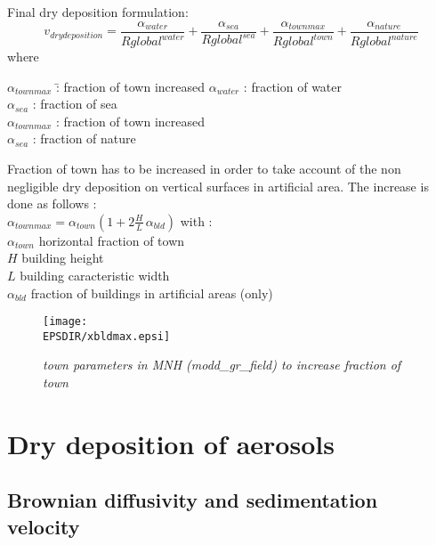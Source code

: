 Final dry deposition formulation:
$$
v_{dry deposition} = \frac{\alpha_{water}}{Rglobal^{water}} +
\frac{\alpha_{sea}}{Rglobal^{sea}} +
\frac{\alpha_{townmax}}{Rglobal^{town}} +
\frac{\alpha_{nature}}{Rglobal^{nature}}
$$
where\\ 
\begin{tabbing}
$\alpha_{townmax}$ \=: fraction of town increased \kill
$\alpha_{water}$ \> : fraction of water \\
$\alpha_{sea}$ \> : fraction of sea \\
$\alpha_{townmax}$ \> : fraction of town increased \\
$\alpha_{sea}$ \> : fraction of nature 
\end{tabbing}
Fraction of town has to be increased in order to take account of the non
negligible dry deposition on vertical surfaces in artificial
area. The increase is done as follows :\\
$\alpha_{townmax} = \alpha_{town} (1+2 \frac{H}{L} \, \alpha_{bld})$
with : \\
$\alpha_{town}$ horizontal fraction of town \\
$H$ building height \\
$L$ building caracteristic width \\
$\alpha_{bld}$ fraction of buildings in artificial areas (only)
\begin{figure}[hbp]
\begin{center}
\texttt{[image: \\EPSDIR/xbldmax.epsi]}
\end{center}
\label{bld}
\caption{\sl{town parameters in MNH (modd\_gr\_field) to increase
fraction of town}} 
\end{figure}

\section{Dry deposition of aerosols}
\subsection*{Brownian diffusivity and sedimentation velocity}


